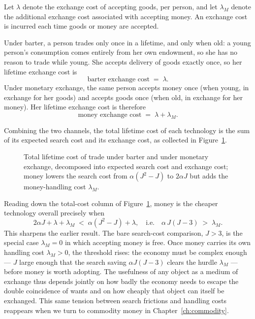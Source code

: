 Let $\lambda$ denote the exchange cost of accepting goods, per person, and let $\lambda_M$ denote the additional exchange cost associated with accepting money. An exchange cost is incurred each time goods or money are accepted.


Under barter, a person trades only once in a lifetime, and only when old: a young person's consumption comes entirely from her own endowment, so she has no reason to trade while young. She accepts delivery of goods exactly once, so her lifetime exchange cost is
\[
\text{barter exchange cost} \;=\; \lambda .
\]
Under monetary exchange, the same person accepts money once (when young, in exchange for her goods) and accepts goods once (when old, in exchange for her money). Her lifetime exchange cost is therefore
\[
\text{money exchange cost} \;=\; \lambda + \lambda_M .
\]


Combining the two channels, the total lifetime cost of each technology is the sum of its expected search cost and its exchange cost, as collected in Figure~\ref{fig:money-2}.

\begin{figure}[h]
\centering

\caption{Total lifetime cost of trade under barter and under monetary exchange, decomposed into expected search cost and exchange cost; money lowers the search cost from $\alpha(J^2-J)$ to $2\alpha J$ but adds the money-handling cost $\lambda_M$.}
\label{fig:money-2}
\end{figure}

Reading down the total-cost column of Figure~\ref{fig:money-2}, money is the cheaper technology overall precisely when
\[
2\alpha J + \lambda + \lambda_M \;<\; \alpha(J^2 - J) + \lambda,
\quad\text{i.e.}\quad
\alpha\,J(J-3) \;>\; \lambda_M .
\]
This sharpens the earlier result. The bare search-cost comparison, $J > 3$, is the special case $\lambda_M = 0$ in which accepting money is free. Once money carries its own handling cost $\lambda_M > 0$, the threshold rises: the economy must be complex enough --- $J$ large enough that the search saving $\alpha J(J-3)$ clears the hurdle $\lambda_M$ --- before money is worth adopting. The usefulness of any object as a medium of exchange thus depends jointly on how badly the economy needs to escape the double coincidence of wants and on how cheaply that object can itself be exchanged. This same tension between search frictions and handling costs reappears when we turn to commodity money in Chapter~\ref{ch:commodity}.
